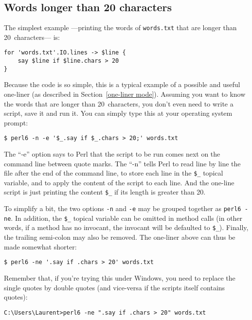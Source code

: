 \subsection{Words longer than 20 characters}

The simplest example ---printing the words of 
{\tt words.txt} that are longer than 20~characters---  is:

\begin{verbatim}
for 'words.txt'.IO.lines -> $line {
    say $line if $line.chars > 20
}
\end{verbatim}
%

Because the code is so simple, this is a typical example 
of a possible and useful one-liner (as described in 
Section~\ref{one-liner mode}). Assuming you want to know the words 
that are longer than 20~characters, you don't even need to 
write a script, save it and run it. You can simply type this at 
your operating system prompt:
\label{one-liner-example}

\begin{verbatim}
$ perl6 -n -e '$_.say if $_.chars > 20;' words.txt
\end{verbatim} 
%
The ``-e'' option says to Perl that the script to be run 
comes next on the command line between quote marks. The 
``-n'' tells Perl to read line by line the file after the 
end of the command line, to store each line in the \verb'$_' 
topical variable, and to apply the content of the script to 
each line. And the one-line script is just printing the 
content  \verb'$_' if its length is greater than 20.

To simplify a bit, the two options \verb'-n' and \verb'-e' 
may be grouped together as \verb"perl6 -ne". In addition, 
the \verb'$_' topical variable can be omitted in method calls 
(in other words, if a method has no invocant, the invocant 
will be defaulted to \verb'$_'). Finally, the trailing 
semi-colon may also be removed. The one-liner above can 
thus be made somewhat shorter:

\begin{verbatim}
$ perl6 -ne '.say if .chars > 20' words.txt
\end{verbatim} 
%
Remember that, if you're trying this under Windows, you need to 
replace the single quotes by double quotes (and vice-versa if 
the scripts itself contains quotes):

\begin{verbatim}
C:\Users\Laurent>perl6 -ne ".say if .chars > 20" words.txt
\end{verbatim} 
%

